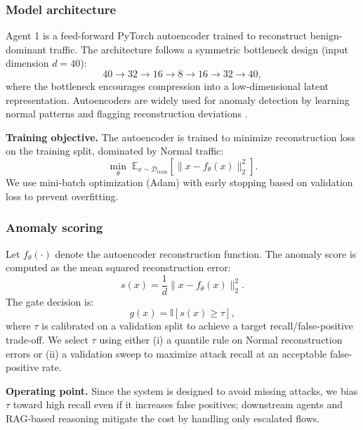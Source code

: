 \subsubsection{Model architecture}
Agent 1 is a feed-forward PyTorch autoencoder trained to reconstruct benign-dominant traffic. The architecture follows a symmetric bottleneck design (input dimension $d=40$):
\begin{equation}
40 \rightarrow 32 \rightarrow 16 \rightarrow 8 \rightarrow 16 \rightarrow 32 \rightarrow 40,
\end{equation}
where the bottleneck encourages compression into a low-dimensional latent representation. Autoencoders are widely used for anomaly detection by learning normal patterns and flagging reconstruction deviations \cite{Hinton2006Reducing,Mirsky2018Kitsune}.

\textbf{Training objective.} The autoencoder is trained to minimize reconstruction loss on the training split, dominated by Normal traffic:
\begin{equation}
 \min_\theta\; \mathbb{E}_{x\sim\mathcal{D}_{\text{train}}}\left[\lVert x - f_\theta(x)\rVert_2^2\right].
\end{equation}
We use mini-batch optimization (Adam) with early stopping based on validation loss to prevent overfitting.

\subsubsection{Anomaly scoring}
Let $f_\theta(\cdot)$ denote the autoencoder reconstruction function. The anomaly score is computed as the mean squared reconstruction error:
\begin{equation}
 s(x) = \frac{1}{d}\lVert x - f_\theta(x) \rVert_2^2.
\end{equation}
The gate decision is:
\begin{equation}
 g(x) = \mathbb{I}[s(x) \ge \tau],
\end{equation}
where $\tau$ is calibrated on a validation split to achieve a target recall/false-positive trade-off. We select $\tau$ using either (i) a quantile rule on Normal reconstruction errors or (ii) a validation sweep to maximize attack recall at an acceptable false-positive rate.

\textbf{Operating point.} Since the system is designed to avoid missing attacks, we bias $\tau$ toward high recall even if it increases false positives; downstream agents and RAG-based reasoning mitigate the cost by handling only escalated flows.

